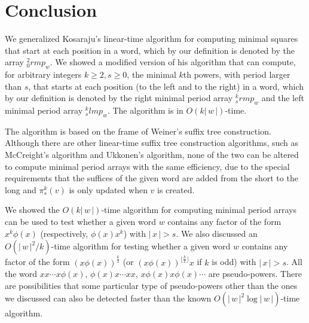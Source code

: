 \documentclass{article}
\def\abs#1{{|\,#1\,|}}
\begin{document}
\section{Conclusion}
We generalized Kosaraju's linear-time algorithm for computing
minimal squares that start at each position in a word, which by our
definition is denoted by the array ${}_0^2rmp_w$. We showed a
modified version of his algorithm that can compute, for arbitrary
integers $k\geq2,s\geq0$, the minimal $k$th powers, with period
larger than $s$, that starts at each position (to the left and to
the right) in a word, which by our definition is denoted by the
right minimal period array ${}_s^krmp_w$ and the left minimal period
array ${}_s^klmp_w$. The algorithm is in $O(k\abs{w})$-time.


The algorithm is based on the frame of Weiner's suffix tree
construction. Although there are other linear-time suffix tree
construction algorithms, such as McCreight's algorithm and Ukkonen's
algorithm, none of the two can be altered to compute minimal period
arrays with the same efficiency, due to the special requirements
that the suffices of the given word are added from the short to the
long and $\pi_s^k(v)$ is only updated when $v$ is created.


We showed the $O(k\abs{w})$-time algorithm for computing minimal
period arrays can be used to test whether a given word $w$ contains
any factor of the form $x^k\phi(x)$ (respectively, $\phi(x)x^k$)
with $\abs{x}>s$. We also discussed an $O(\abs{w}^2/k)$-time
algorithm for testing whether a given word $w$ contains any factor
of the form $\left(x\phi(x)\right)^{\frac{k}{2}}$ (or
$\left(x\phi(x)\right)^{\lfloor\frac{k}{2}\rfloor}x$ if $k$ is odd)
with $\abs{x}>s$. All the word $xx\cdots x\phi(x)$, $\phi(x)x\cdots
xx$, $x\phi(x)x\phi(x)\cdots$ are pseudo-powers. There are
possibilities that some particular type of pseudo-powers other than
the ones we discussed can also be detected faster than the known
$O(\abs{w}^2\log\abs{w})$-time algorithm.
\end{document}
